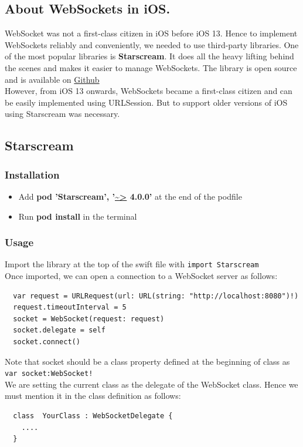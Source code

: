 \documentclass[12pt, conference, a4paper]{article}
\begin{document}
\subsection{About WebSockets in iOS.}
WebSocket was not a first-class citizen in iOS before iOS 13. Hence to implement WebSockets reliably and conveniently, we needed to use third-party libraries. One of the most popular libraries is \textbf{Starscream}. It does all the heavy lifting behind the scenes and makes it easier to manage WebSockets. The library is open source and is available on \href{https://github.com/daltoniam/Starscream}{Github}\\
However, from iOS 13 onwards, WebSockets became a first-class citizen and can be easily implemented using URLSession. 
But to support older versions of iOS using Starscream was necessary.
\subsection{Starscream}
\subsubsection{Installation}
\begin{itemize}
  \item Add \textbf{pod 'Starscream', '\url{~>} 4.0.0'} at the end of the podfile
  \item Run \textbf{pod install} in the terminal
\end{itemize}
\subsubsection{Usage}
Import the library at the top of the swift file with \texttt{import Starscream}\\
Once imported, we can open a connection to a WebSocket server as follows:
\begin{verbatim}
  var request = URLRequest(url: URL(string: "http://localhost:8080")!)
  request.timeoutInterval = 5
  socket = WebSocket(request: request)
  socket.delegate = self
  socket.connect()
\end{verbatim}
Note that socket should be a class property defined at the beginning of class as \texttt{var socket:WebSocket!}\\

We are setting the current class as the delegate of the WebSocket class. Hence we must mention it in the class definition as follows:
\begin{verbatim}
  class  YourClass : WebSocketDelegate {
    ....
  }
\end{verbatim}
\end{document}
